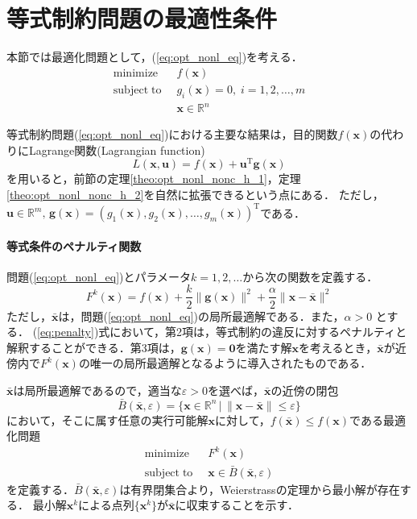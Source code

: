 \documentclass{jsreport}
\begin{document}
\section{等式制約問題の最適性条件}
本節では最適化問題として，(\ref{eq:opt_nonl_eq})を考える．
\begin{align}\label{eq:opt_nonl_eq}
  \mathrm{minimize} \; \; &f(\bm{x}) \nonumber\\
  \mathrm{subject \; to} \; \; &g_i(\bm{x}) = 0, \; i = 1, 2, \ldots, m \nonumber \\
  &\bm{x} \in \mathbb{R}^n
\end{align}

等式制約問題(\ref{eq:opt_nonl_eq})における主要な結果は，目的関数$f(\bm{x})$の代わりにLagrange関数(Lagrangian function)
\begin{equation}\label{eq:lag}
  L(\bm{x}, \bm{u}) = f(\bm{x}) + \bm{u}^{\mathrm{T}} \bm{g}(\bm{x})
\end{equation}
を用いると，前節の定理\ref{theo:opt_nonl_nonc_h_1}，定理\ref{theo:opt_nonl_nonc_h_2}を自然に拡張できるという点にある．
ただし，$\bm{u} \in \mathbb{R}^m, \, \bm{g}(\bm{x}) = (g_1(\bm{x}), g_2(\bm{x}), \ldots, g_m(\bm{x}))^{\mathrm{T}}$である．

\paragraph{等式条件のペナルティ関数}
問題(\ref{eq:opt_nonl_eq})とパラメータ$k = 1, 2, \ldots$から次の関数を定義する．
\begin{equation}\label{eq:penalty}
  F^k(\bm{x}) = f(\bm{x}) + \frac{k}{2}\|\bm{g}(\bm{x})\|^2 + \frac{\alpha}{2}\|\bm{x} - \bar{\bm{x}}\|^2
\end{equation}
ただし，$\bar{\bm{x}}$は，問題(\ref{eq:opt_nonl_eq})の局所最適解である．また，$\alpha > 0$
とする．
(\ref{eq:penalty})式において，第2項は，等式制約の違反に対するペナルティと解釈することができる．第3項は，$\bm{g}(\bm{x}) = \bm{0}$を満たす解$\bm{x}$を考えるとき，$\bar{\bm{x}}$が近傍内で$F^k(\bm{x})$の唯一の局所最適解となるように導入されたものである．

$\bar{\bm{x}}$は局所最適解であるので，適当な$\varepsilon > 0$を選べば，$\bar{\bm{x}}$の近傍の閉包
\begin{equation}
  \bar{B}(\bar{\bm{x}}, \varepsilon) = \{\bm{x} \in \mathbb{R}^n \, | \, \|\bm{x} - \bar{\bm{x}}\| \leq \varepsilon\}
\end{equation}
において，そこに属す任意の実行可能解$\bm{x}$に対して，$f(\bar{\bm{x}}) \leq f(\bm{x})$である最適化問題
\begin{align}\label{eq:opt_penal}
  \mathrm{minimize} \; \; &F^k(\bm{x}) \nonumber\\
  \mathrm{subject \; to} \; \; &\bm{x} \in \bar{B}(\bar{\bm{x}}, \varepsilon)
\end{align}
を定義する．$\bar{B}(\bar{\bm{x}}, \varepsilon)$は有界閉集合より，Weierstrassの定理から最小解が存在する．
最小解$\bm{x}^k$による点列$\{\bm{x}^k\}$が$\bar{\bm{x}}$に収束することを示す．
\end{document}
